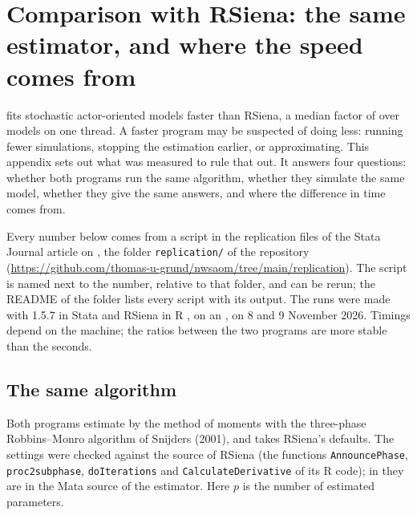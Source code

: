 \chapter{Comparison with RSiena: the same estimator, and where the speed comes from}
\label{app:samest}\label{ch:benchmark}

\graphicspath{{bench/}}

\nwsaom{} fits stochastic actor-oriented models faster than RSiena, a median factor
of \benchspmed{} over \benchnmodels{} models on one thread. A faster program may be
suspected of doing less: running fewer simulations, stopping the estimation earlier,
or approximating. This appendix sets out what was measured to rule that out. It
answers four questions: whether both programs run the same algorithm, whether they
simulate the same model, whether they give the same answers, and where the
difference in time comes from.

Every number below comes from a script in the replication files of the Stata
Journal article on \nwsaom{}, the folder \texttt{replication/} of the repository
(\url{https://github.com/thomas-u-grund/nwsaom/tree/main/replication}). The script is
named next to the number, relative to that folder, and can be rerun; the README of the
folder lists every script with its output. The runs were made with \nwsaom{} 1.5.7 in Stata \benchstata{} and RSiena
\benchrsiena{} in R \benchrver{}, on an \benchmachine{}, on 8 and 9 November
2026. Timings depend on the machine; the ratios between the two programs are more
stable than the seconds.

\section{The same algorithm}\label{sec:samest-alg}

Both programs estimate by the method of moments with the three-phase Robbins--Monro
algorithm of Snijders (2001), and \nwsaom{} takes RSiena's defaults. The settings
were checked against the source of RSiena \benchrsiena{} (the functions
\texttt{AnnouncePhase}, \texttt{proc2subphase}, \texttt{doIterations} and
\texttt{CalculateDerivative} of its R code); in \nwsaom{} they are in the Mata source
of the estimator. Here $p$ is the number of estimated parameters.


